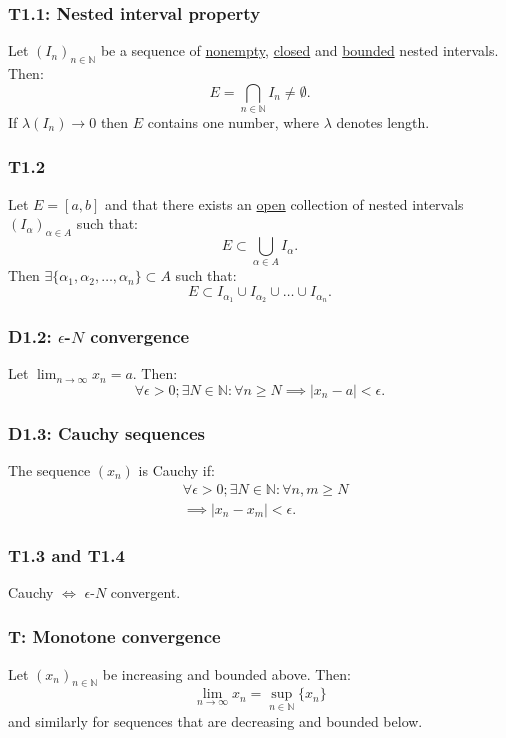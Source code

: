 \documentclass{article}
\begin{document}
\begin{multicols*}{3}
\subsubsection*{T1.1: Nested interval property}
Let $(I_n)_{n\in\mathbb{N}}$ be a sequence of
\underline{nonempty}, \underline{closed}
and \underline{bounded} nested intervals.
Then:
$$E=\bigcap_{n\in\mathbb{N}}I_n
\neq\emptyset.$$
If $\lambda(I_n)\rightarrow0$
then $E$ contains one number,
where $\lambda$ denotes length.

\subsubsection*{T1.2}
Let $E=[a,b]$ and that there exists an \underline{open}
collection of nested intervals
$(I_{\alpha})_{\alpha\in A}$ such that:
$$E\subset\bigcup_{\alpha\in A}I_{\alpha}.$$
Then $\exists\{\alpha_1,\alpha_2,\dots,\alpha_n\}
\subset A$ such that:
$$E\subset I_{\alpha_1}\cup I_{\alpha_2}\cup
\dots\cup I_{\alpha_n}.$$

\subsubsection*{D1.2: $\epsilon$-$N$ convergence}
Let $\displaystyle\lim_{n\rightarrow\infty}x_n=a$. Then:
$$\forall\epsilon>0; \exists N\in\mathbb{N}:
\forall n\geq N\implies |x_n-a|<\epsilon.$$

\subsubsection*{D1.3: Cauchy sequences}
The sequence $(x_n)$ is Cauchy if:
\begin{align*}
    &\forall\epsilon>0;\exists N\in\mathbb{N}:
    \forall n,m\geq N \\ &\implies |x_n-x_m|<\epsilon.
\end{align*}

\subsubsection*{T1.3 and T1.4}
Cauchy $\iff$ $\epsilon$-$N$ convergent.

\subsubsection*{T: Monotone convergence}
Let $(x_n)_{n\in\mathbb{N}}$ be increasing and
bounded above. Then:
$$\lim_{n\rightarrow\infty}x_n=\sup_{n\in\mathbb{N}}
\{x_n\}$$
and similarly for sequences that are
decreasing and bounded below.


\end{multicols*}
\end{document}
